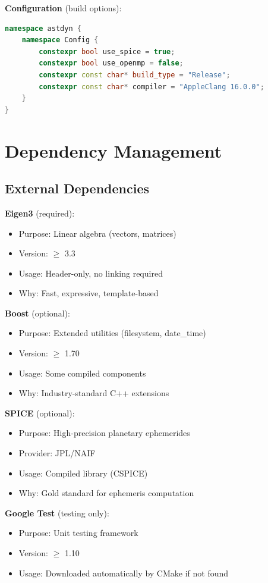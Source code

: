 \textbf{Configuration} (build options):
\begin{lstlisting}[language=C++]
namespace astdyn {
    namespace Config {
        constexpr bool use_spice = true;
        constexpr bool use_openmp = false;
        constexpr const char* build_type = "Release";
        constexpr const char* compiler = "AppleClang 16.0.0";
    }
}
\end{lstlisting}

\section{Dependency Management}

\subsection{External Dependencies}

\textbf{Eigen3} (required):
\begin{itemize}
    \item Purpose: Linear algebra (vectors, matrices)
    \item Version: $\ge$ 3.3
    \item Usage: Header-only, no linking required
    \item Why: Fast, expressive, template-based
\end{itemize}

\textbf{Boost} (optional):
\begin{itemize}
    \item Purpose: Extended utilities (filesystem, date\_time)
    \item Version: $\ge$ 1.70
    \item Usage: Some compiled components
    \item Why: Industry-standard C++ extensions
\end{itemize}

\textbf{SPICE} (optional):
\begin{itemize}
    \item Purpose: High-precision planetary ephemerides
    \item Provider: JPL/NAIF
    \item Usage: Compiled library (CSPICE)
    \item Why: Gold standard for ephemeris computation
\end{itemize}

\textbf{Google Test} (testing only):
\begin{itemize}
    \item Purpose: Unit testing framework
    \item Version: $\ge$ 1.10
    \item Usage: Downloaded automatically by CMake if not found
\end{itemize}

